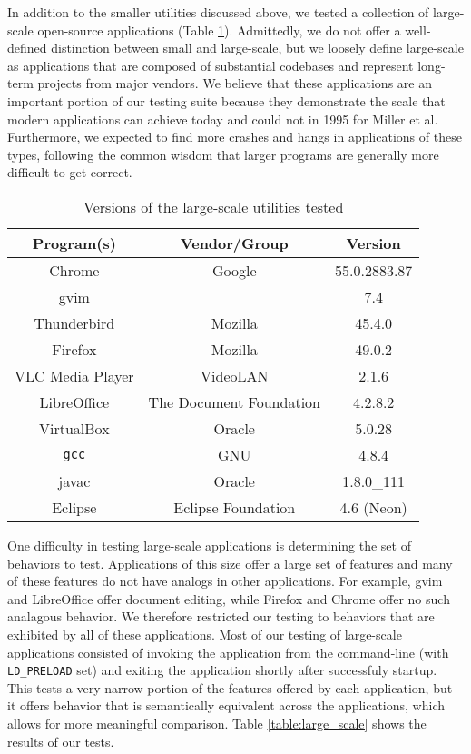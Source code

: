 In addition to the smaller utilities discussed above, we tested a collection of large-scale open-source applications (Table \ref{tab:large_scale_versions}). Admittedly, we do not offer a well-defined distinction between small and large-scale, but we loosely define large-scale as applications that are composed of substantial codebases and represent long-term projects from major vendors. We believe that these applications are an important portion of our testing suite because they demonstrate the scale that modern applications can achieve today and could not in 1995 for Miller et al. Furthermore, we expected to find more crashes and hangs in applications of these types, following the common wisdom that larger programs are generally more difficult to get correct.

\begin{table}[h!]
\begin{center}
\begin{tabular}{ |c|c|c| }
\hline
\multicolumn{1}{|c|}{\textbf{Program(s)}} & \multicolumn{1}{c|}{\textbf{Vendor/Group}} & \multicolumn{1}{c|}{\textbf{Version}} \\
\hline
Chrome & Google & 55.0.2883.87 \\
gvim & & 7.4 \\
Thunderbird & Mozilla & 45.4.0\\
Firefox & Mozilla & 49.0.2 \\
VLC Media Player &VideoLAN & 2.1.6\\
LibreOffice & The Document Foundation & 4.2.8.2\\
VirtualBox & Oracle & 5.0.28\\
\texttt{gcc} & GNU & 4.8.4\\
javac & Oracle & 1.8.0\_111\\
Eclipse & Eclipse Foundation & 4.6 (Neon) \\
\hline
\end{tabular}
\caption{Versions of the large-scale utilities tested}
\label{tab:large_scale_versions}
\end{center}
\end{table}


One difficulty in testing large-scale applications is determining the set of behaviors to test. Applications of this size offer a large set of features and many of these features do not have analogs in other applications. For example, gvim and LibreOffice offer document editing, while Firefox and Chrome offer no such analagous behavior. We therefore restricted our testing to behaviors that are exhibited by all of these applications. Most of our testing of large-scale applications consisted of invoking the application from the command-line (with \texttt{LD\_PRELOAD} set) and exiting the application shortly after successfuly startup. This tests a very narrow portion of the features offered by each application, but it offers behavior that is semantically equivalent across the applications, which allows for more meaningful comparison. Table \ref{table:large_scale} shows the results of our tests.

